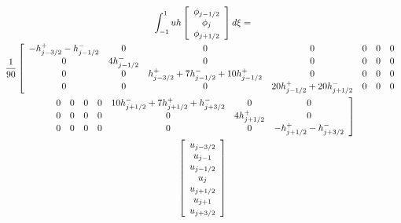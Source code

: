 \documentclass[12pt]{article}
\begin{document}
\begin{landscape}
	\begin{multline*}
	\int_{-1}^{1} uh \left[\begin{array}{c}\phi_{j-1/2} \\\phi_{j}\\\phi_{j+1/2} \end{array}\right] d \xi = \\
	\frac{1}{90} \left[\begin{array}{c c c c c c c}
	- h^+ _{j - 3/2} - h^- _{j - 1/2}  & 0 & 0 &0 &0 & 0 & 0  \\
	0 &4h^- _{j - 1/2} & 0 & 0 &0 & 0 &0  \\
	0 & 0 &h^+ _{j - 3/2} + 7h^- _{j - 1/2} + 10 h^+ _{j - 1/2}  & 0 & 0 & 0 &0  \\ 
	0 & 0 & 0 & 20h^+ _{j - 1/2} +  20 h^- _{j + 1/2}& 0 & 0 &0 \end{array} \right. \\ 
	\left. \begin{array}{c c c c c c c}
	0 & 0 & 0 & 0 & 10h^- _{j + 1/2} + 7h^+ _{j + 1/2} +h^- _{j + 3/2} & 0 &0  \\
	0 & 0 & 0 & 0 &0 & 4 h^+ _{j + 1/2}  &0\\
	0 & 0 & 0 & 0 &0 & 0 &-h^+ _{j + 1/2} - h^- _{j + 3/2} \end{array}\right]\\ 
	\left[\begin{array}{c}u_{j-3/2} \\ u_{j-1} \\u_{j-1/2} \\u_{j}\\u_{j+1/2} \\ u_{j+1} \\ u_{j+3/2} \end{array}\right]
	\end{multline*}
	
\end{landscape}

\newpage
\end{document}

